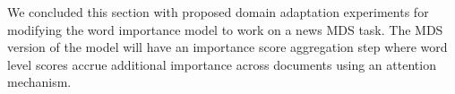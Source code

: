 We concluded this section with proposed domain adaptation experiments for
modifying the word importance model to work on a news MDS task. 
The MDS version of the model will have an importance score aggregation step
where word level scores accrue additional importance across documents 
using an attention mechanism.















